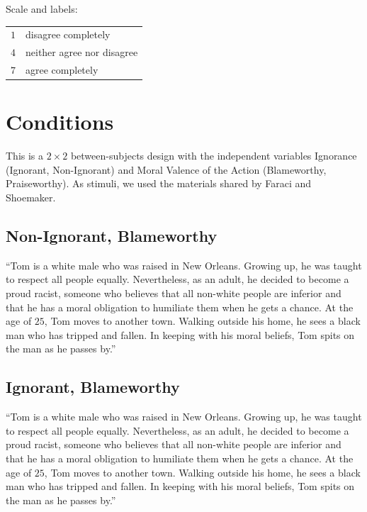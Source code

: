 \documentclass[scrarticle]{scrartcl}
\begin{document}
\vspace{0.75em}
\noindent Scale and labels:

\vspace{0.75em}
\begin{tabular}{r @{ = } l}
    $1$   & disagree completely          \\
    $4$   & neither agree nor disagree   \\
    $7$   & agree completely             \\
\end{tabular}


\section{Conditions}
This is a $2 \times 2$ between-subjects design with the independent variables Ignorance (Ignorant, Non-Ignorant) and Moral Valence of the Action (Blameworthy, Praiseworthy).
As stimuli, we used the materials shared by Faraci and Shoemaker.


\subsection*{Non-Ignorant, Blameworthy}
\enquote{Tom is a white male who was raised in New Orleans.
Growing up, he was taught to respect all people equally.
Nevertheless, as an adult, he decided to become a proud racist, someone who believes that all non-white people are inferior and that he has a moral obligation to humiliate them when he gets a chance.
At the age of $25$, Tom moves to another town.
Walking outside his home, he sees a black man who has tripped and fallen.
In keeping with his moral beliefs, Tom spits on the man as he passes by.}


\subsection*{Ignorant, Blameworthy}
\enquote{Tom is a white male who was raised in New Orleans.
Growing up, he was taught to respect all people equally.
Nevertheless, as an adult, he decided to become a proud racist, someone who believes that all non-white people are inferior and that he has a moral obligation to humiliate them when he gets a chance.
At the age of $25$, Tom moves to another town.
Walking outside his home, he sees a black man who has tripped and fallen.
In keeping with his moral beliefs, Tom spits on the man as he passes by.}
\end{document}
